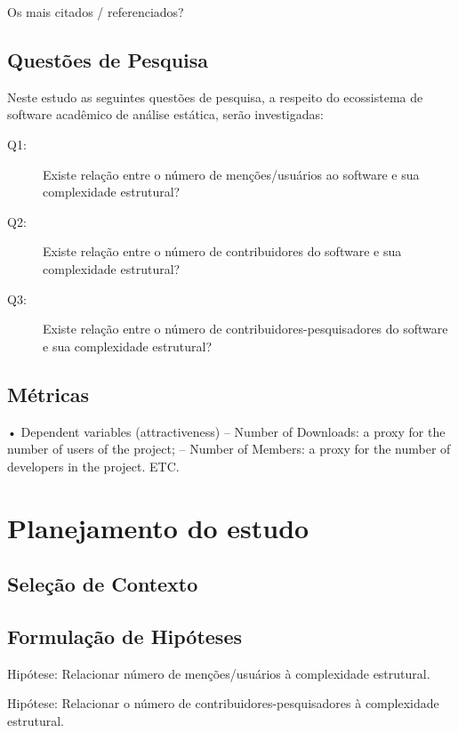 Os mais citados / referenciados?


\subsection{Questões de Pesquisa}

Neste estudo as seguintes questões de pesquisa, a respeito do ecossistema de
software acadêmico de análise estática, serão investigadas:


\newcommand{\QuestaoOne}{Existe relação entre o número de menções/usuários ao software e sua complexidade estrutural?}
\newcommand{\QuestaoTwo}{Existe relação entre o número de contribuidores do software e sua complexidade estrutural?}
\newcommand{\QuestaoThree}{Existe relação entre o número de contribuidores-pesquisadores do software e sua complexidade estrutural?}

\begin{description}
  \item [Q1:] \QuestaoOne
  \item [Q2:] \QuestaoTwo
  \item [Q3:] \QuestaoThree
\end{description}

\subsection{Métricas}

• Dependent variables (attractiveness)
– Number of Downloads: a proxy for the number of users of the project;
– Number of Members: a proxy for the number of developers in the project.
ETC.

\section{Planejamento do estudo}

\subsection{Seleção de Contexto}

\subsection{Formulação de Hipóteses}

Hipótese: Relacionar número de menções/usuários à complexidade estrutural.

Hipótese: Relacionar o número de contribuidores-pesquisadores à complexidade estrutural.

